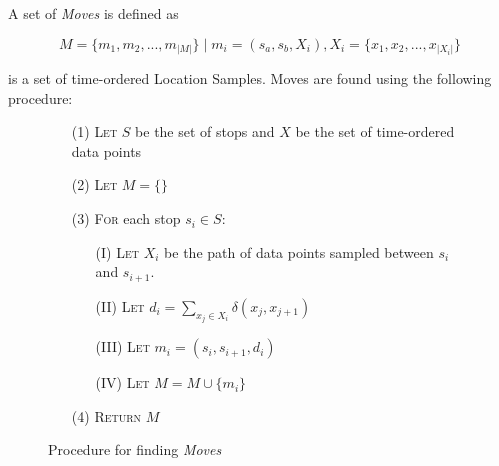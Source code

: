 A set of \textit{Moves} is defined as 

\begin{equation}
\label{eq:feature-moves}
M = \{m_1, m_2, ..., m_{|M|}\} \;| \; m_i = (s_a, s_b, X_i), X_i = \{x_1, x_2, ..., x_{|X_i|}\}
\end{equation}

is a set of time-ordered Location Samples. Moves are found using the following procedure:

\begin{figure}[h]
    \centering
    \begin{center}
    \begin{itemize}
    \item[(1)] \textsc{Let} $S$ be the set of stops and $X$ be the set of time-ordered data points
    \item[(2)] \textsc{Let} $M = \{ \}$
    \item[(3)] \textsc{For} each stop $s_i \in S$:
    \begin{itemize}
        \item[(I)] \textsc{Let} $X_i$ be the path of data points sampled between $s_i$ and $s_{i+1}$.
        \item[(II)] \textsc{Let} $d_i = \sum_{x_j \in X_i} \delta(x_j, x_{j+1})$ 
        \item[(III)] \textsc{Let} $m_i = (s_i, s_{i+1}, d_i)$ 
        \item[(IV)] \textsc{Let} $M = M \cup \{m_i\}$ 
    \end{itemize}
    \item[(4)] \textsc{Return} $M$
\end{itemize} 
\end{center}
    \caption{Procedure for finding \textit{Moves}}
    \label{fig:find_moves}
\end{figure}

